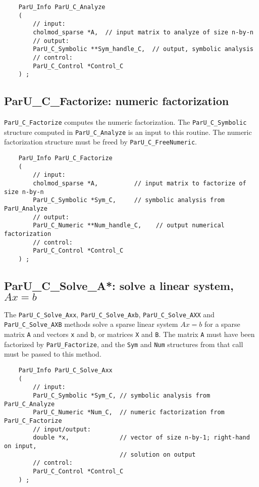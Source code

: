\documentclass[12pt]{article}
\begin{document}
    {\footnotesize
    \begin{verbatim}
    ParU_Info ParU_C_Analyze
    (
        // input:
        cholmod_sparse *A,  // input matrix to analyze of size n-by-n
        // output:
        ParU_C_Symbolic **Sym_handle_C,  // output, symbolic analysis
        // control:
        ParU_C_Control *Control_C
    ) ; \end{verbatim} }

\subsection{{\sf ParU\_C\_Factorize}: numeric factorization}

    \verb'ParU_C_Factorize' computes the numeric factorization.  The
    \verb'ParU_C_Symbolic' structure computed in \verb'ParU_C_Analyze' is an
    input to this routine.
    The numeric factorization structure must be freed by \verb'ParU_C_FreeNumeric'.

    {\footnotesize
    \begin{verbatim}
    ParU_Info ParU_C_Factorize
    (
        // input:
        cholmod_sparse *A,          // input matrix to factorize of size n-by-n
        ParU_C_Symbolic *Sym_C,     // symbolic analysis from ParU_Analyze
        // output:
        ParU_C_Numeric **Num_handle_C,    // output numerical factorization
        // control:
        ParU_C_Control *Control_C
    ) ; \end{verbatim} }

\subsection{{\sf ParU\_C\_Solve\_A*}: solve a linear system, $Ax=b$}

    The \verb'ParU_C_Solve_Axx',  \verb'ParU_C_Solve_Axb',
        \verb'ParU_C_Solve_AXX' and \verb'ParU_C_Solve_AXB'
        methods solve a sparse linear system $Ax=b$ for a sparse
        matrix \verb'A' and vectors \verb'x' and \verb'b', or matrices
        \verb'X' and \verb'B'.  The matrix \verb'A' must have been factorized
        by \verb'ParU_Factorize', and the \verb'Sym' and \verb'Num' structures
        from that call must be passed to this method.

    {\footnotesize
    \begin{verbatim}
    ParU_Info ParU_C_Solve_Axx
    (
        // input:
        ParU_C_Symbolic *Sym_C, // symbolic analysis from ParU_C_Analyze
        ParU_C_Numeric *Num_C,  // numeric factorization from ParU_C_Factorize
        // input/output:
        double *x,              // vector of size n-by-1; right-hand on input,
                                // solution on output
        // control:
        ParU_C_Control *Control_C
    ) ; \end{verbatim} }
\end{document}
